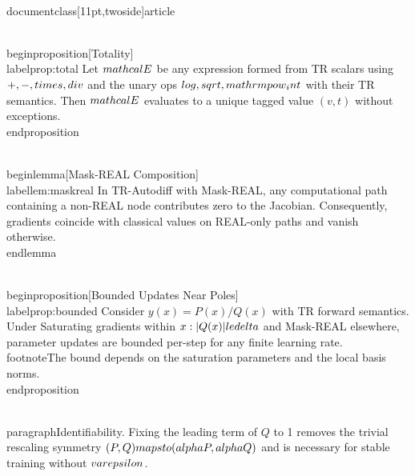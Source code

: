 \\documentclass[11pt,twoside]{article}
\begin{document}
\\begin{proposition}[Totality]\\label{prop:total}
Let $\\mathcal{E}$ be any expression formed from TR scalars using $+, -, \\times, \\div$ and the unary ops $\\{\\log, \\sqrt, \\mathrm{pow\\_int}\\}$ with their TR semantics. Then $\\mathcal{E}$ evaluates to a unique tagged value $(v,t)$ without exceptions.
\\end{proposition}

\\begin{lemma}[Mask-REAL Composition]\\label{lem:maskreal}
In TR-Autodiff with Mask-REAL, any computational path containing a non-REAL node contributes zero to the Jacobian. Consequently, gradients coincide with classical values on REAL-only paths and vanish otherwise.
\\end{lemma}

\\begin{proposition}[Bounded Updates Near Poles]\\label{prop:bounded}
Consider $y(x)=P(x)/Q(x)$ with TR forward semantics. Under Saturating gradients within $\\{x: |Q(x)|\\le \\delta\\}$ and Mask-REAL elsewhere, parameter updates are bounded per-step for any finite learning rate.\\footnote{The bound depends on the saturation parameters and the local basis norms.}
\\end{proposition}

\\paragraph{Identifiability.} Fixing the leading term of $Q$ to 1 removes the trivial rescaling symmetry $(P,Q)\\mapsto (\\alpha P, \\alpha Q)$ and is necessary for stable training without $\\varepsilon$.
\end{document}
